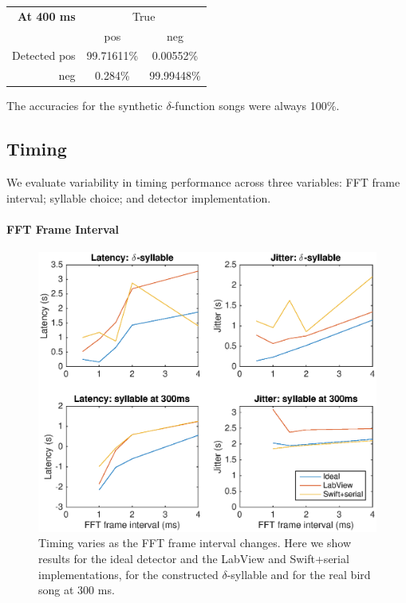 \documentclass[10pt,letterpaper]{article}
\renewcommand{\subsubsection}[1]{\paragraph{#1}}
\begin{document}
\vspace{8pt}\par\noindent
\begin{tabular}{r|cc}
  {\bf At 400 ms} & \multicolumn{2}{c}{True} \\ 
  & pos & neg \\ 
  \hline  Detected pos & 99.71611\% & 0.00552\%\\ 
  neg & 0.284\% & 99.99448\%\\ 
\end{tabular}
\vspace{8pt}\par\noindent
The accuracies for the synthetic $\delta$-function songs were always 100\%.

\subsection{Timing}

We evaluate variability in timing performance across three variables: FFT frame interval; syllable choice; and detector implementation.

\subsubsection{FFT Frame Interval}

\begin{figure}
  \includegraphics[width=\textwidth]{TimingVsFrame}
  \caption{Timing varies as the FFT frame interval changes.  Here we show results for the ideal detector and the LabView and Swift+serial implementations, for the constructed $\delta$-syllable and for the real bird song at 300 ms.}
  \label{fig:TimingVsFrame}
\end{figure}
\end{document}
